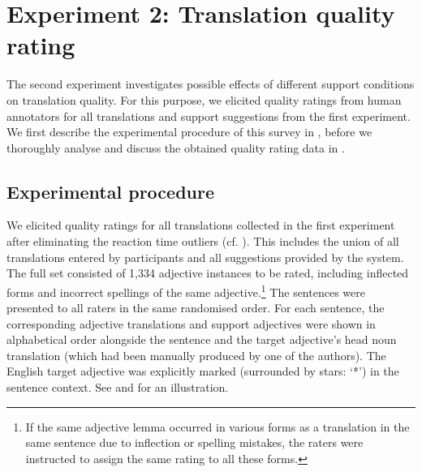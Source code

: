 \documentclass[output=paper]{LSP/langsci}
\begin{document}



\section{Experiment 2: Translation quality rating}
\label{sec:kremer:exp-qr}
The second experiment investigates possible effects of different
support conditions on translation quality. For this purpose, we
elicited quality ratings from human annotators for all translations
and support suggestions from the first experiment. We first describe
the experimental procedure of this survey in
, before we thoroughly analyse and
discuss the obtained quality rating data in
.


\subsection{Experimental procedure}
\label{sec:kremer:exp-qr-procedure}

We elicited quality ratings for all translations collected in the
first experiment after eliminating the reaction time outliers (cf. ). This includes the union of all
translations entered by participants and all suggestions provided by
the system. The full set consisted of 1,334 adjective instances to be
rated, including inflected forms and incorrect spellings of the same
adjective.\footnote{If the same adjective lemma occurred in various forms as a translation in the same sentence due to inflection or spelling mistakes, the raters were instructed to assign the same rating to all these forms.} The sentences were presented to all raters in the same
randomised order. For each sentence, the corresponding adjective
translations and support adjectives were shown in alphabetical order
alongside the sentence and the target adjective's head noun
translation (which had been manually produced by one of the
authors). The English target adjective was explicitly marked
(surrounded by stars: `*') in the sentence context. See
 and
 for an illustration.
\end{document}
